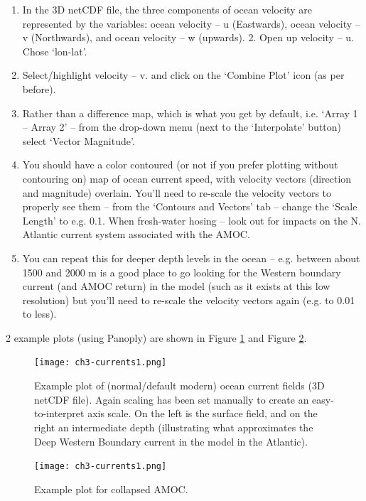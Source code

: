 \documentclass[11pt,fleqn]{book} %
\begin{document}
\begin{enumerate}[noitemsep]
\item  In the 3D netCDF file, the three components of ocean velocity are represented by the variables: ocean velocity – u (Eastwards), ocean velocity – v (Northwards), and ocean velocity – w (upwards). 2. Open up velocity – u. Chose ‘lon-lat’.
\item Select/highlight velocity – v. and click on the ‘Combine Plot’ icon (as per before).
\item Rather than a difference map, which is what you get by default, i.e. ‘Array 1 – Array 2’ – from the drop-down menu (next to the ‘Interpolate’ button) select ‘Vector Magnitude’.
\item You should have a color contoured (or not if you prefer plotting without contouring on) map of ocean current speed, with velocity vectors (direction and magnitude) overlain. You’ll need to re-scale the velocity vectors to properly see them – from the ‘Contours and Vectors’ tab – change the ‘Scale Length’ to e.g. 0.1. When fresh-water hosing – look out for impacts on the N. Atlantic current system associated with the AMOC.
\item You can repeat this for deeper depth levels in the ocean – e.g. between about 1500 and 2000 m is a good place to go looking for the Western boundary current (and AMOC return) in the model (such as it exists at this low resolution) but you’ll need to re-scale the velocity vectors again (e.g. to 0.01 to less).
\end{enumerate}

2 example plots (using Panoply) are shown in Figure \ref{fig:ch3-currents1} and Figure \ref{fig:ch3-currents2}. 

\begin{figure}
\texttt{[image: ch3-currents1.png]}\centering
\vspace{-0mm}
\caption{Example plot of (normal/default modern) ocean current fields (3D netCDF file). Again scaling has been set manually to create an easy-to-interpret axis scale. On the left is the surface field, and on the right an intermediate depth (illustrating what approximates the Deep Western Boundary current in the model in the Atlantic).}
\label{fig:ch3-currents1}
\end{figure}

\begin{figure}
\texttt{[image: ch3-currents1.png]}\centering
\vspace{-0mm}
\caption{Example plot for collapsed AMOC.}
\label{fig:ch3-currents2}
\end{figure}
\end{document}
